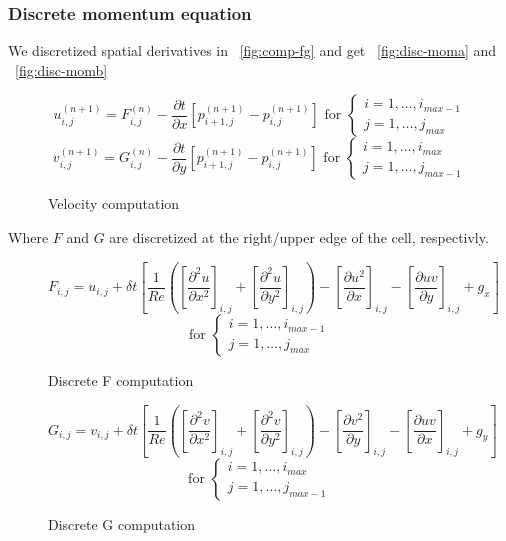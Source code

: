 \subsubsection{Discrete momentum equation}
We discretized spatial derivatives in ~\ref{fig:comp-fg} and get ~\ref{fig:disc-moma} and ~\ref{fig:disc-momb}
\begin{figure}[H]
	\centering
\[ u_{i,j}^{(n+1)} = F_{i,j}^{(n)} - \frac{\partial t}{\partial x} \left[ p_{i+1,j}^{(n+1)} - p_{i,j}^{(n+1)} \right] \text{ for } \begin{cases} i = 1,\dots,i_{max-1}\\ j = 1,\dots,j_{max}\end{cases} \]
\[ v_{i,j}^{(n+1)} = G_{i,j}^{(n)} - \frac{\partial t}{\partial y} \left[ p_{i+1,j}^{(n+1)} - p_{i,j}^{(n+1)} \right] \text{ for } \begin{cases} i = 1,\dots,i_{max}\\ j = 1,\dots,j_{max-1}\end{cases} \]
	\renewcommand{\thefigure}{3.34, 3.35}
	\caption{Velocity computation}
	\label{fig:velocity-computation}
\end{figure}

Where $F$ and $G$ are discretized at the right/upper edge of the cell, respectivly.

\begin{figure}[H]
	\centering
   \[ F_{i,j} = u_{i,j} + \delta t \left[ \frac{1}{Re} \left(
      \left[\frac{\partial^2 u}{\partial x^2}\right]_{i,j} + 
      \left[\frac{\partial^2 u}{\partial y^2}\right]_{i,j}  \right) - 
      \left[\frac{\partial u^2}{\partial x}\right]_{i,j} -
      \left[\frac{\partial uv}{\partial y}\right]_{i,j} +
      g_x\right] \]
   \[ \text{for } \begin{cases} i = 1,\dots, i_{max-1}\\j = 1,\dots,j_{max}\end{cases} \]
	\renewcommand{\thefigure}{3.36}
	\caption{Discrete F computation}
	\label{fig:disc-f}
\end{figure}


\begin{figure}[H]
	\centering
   \[ G_{i,j} = v_{i,j} + \delta t \left[ \frac{1}{Re} \left(
      \left[\frac{\partial^2 v}{\partial x^2}\right]_{i,j} + 
      \left[\frac{\partial^2 v}{\partial y^2}\right]_{i,j}  \right) - 
      \left[\frac{\partial v^2}{\partial y}\right]_{i,j} -
      \left[\frac{\partial uv}{\partial x}\right]_{i,j} +
      g_y\right] \]
   \[ \text{for } \begin{cases} i = 1,\dots, i_{max}\\j = 1,\dots,j_{max-1}\end{cases} \]
	\renewcommand{\thefigure}{3.37}
	\caption{Discrete G computation}
	\label{fig:disc-g}
\end{figure}

